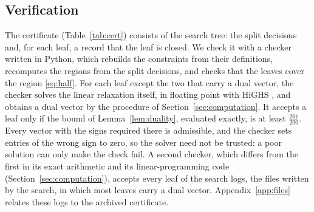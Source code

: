 \documentclass[11pt]{amsart}
\theoremstyle{definition}
\theoremstyle{remark}
\numberwithin{equation}{section}
\newcommand{\LAM}{\tfrac{267}{200}}
\begin{document}
\subsection*{Verification}
The certificate (Table~\ref{tab:cert}) consists of the search tree: the split decisions and, for each leaf, a record that the leaf is closed. We check it with a checker written in Python, which rebuilds the constraints from their definitions, recomputes the regions from the split decisions, and checks that the leaves cover the region \eqref{eq:half}. For each leaf except the two that carry a dual vector, the checker solves the linear relaxation itself, in floating point with HiGHS \cite{HiGHS}, and obtains a dual vector by the procedure of Section~\ref{sec:computation}. It accepts a leaf only if the bound of Lemma~\ref{lem:duality}, evaluated exactly, is at least $\LAM$. Every vector with the signs required there is admissible, and the checker sets entries of the wrong sign to zero, so the solver need not be trusted: a poor solution can only make the check fail. A second checker, which differs from the first in its exact arithmetic and its linear-programming code (Section~\ref{sec:computation}), accepts every leaf of the search logs, the files written by the search, in which most leaves carry a dual vector. Appendix~\ref{app:files} relates these logs to the archived certificate.
\end{document}
